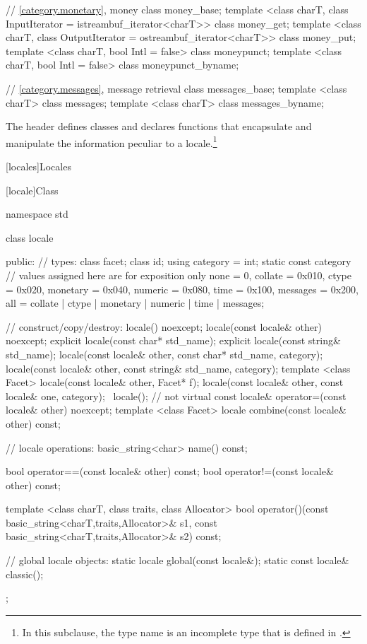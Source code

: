 \begin{codeblock}
{  // \ref{category.monetary}, money
  class money_base;
  template <class charT, class InputIterator = istreambuf_iterator<charT>>  class money_get;
  template <class charT, class OutputIterator = ostreambuf_iterator<charT>> class money_put;
  template <class charT, bool Intl = false> class moneypunct;
  template <class charT, bool Intl = false> class moneypunct_byname;

  // \ref{category.messages}, message retrieval
  class messages_base;
  template <class charT> class messages;
  template <class charT> class messages_byname;
}
\end{codeblock}

\pnum
The header
defines classes and declares functions that encapsulate and manipulate
the information peculiar to a locale.\footnote{In this subclause, the type name
is an incomplete type that is defined in
%
.}

[locales]{Locales}

[locale]{Class }

%
\begin{codeblock}
namespace std {
  class locale {
  public:
    // types:
    class facet;
    class id;
    using category = int;
    static const category   // values assigned here are for exposition only
      none     = 0,
      collate  = 0x010, ctype    = 0x020,
      monetary = 0x040, numeric  = 0x080,
      time     = 0x100, messages = 0x200,
      all = collate | ctype | monetary | numeric | time  | messages;

    // construct/copy/destroy:
    locale() noexcept;
    locale(const locale& other) noexcept;
    explicit locale(const char* std_name);
    explicit locale(const string& std_name);
    locale(const locale& other, const char* std_name, category);
    locale(const locale& other, const string& std_name, category);
    template <class Facet> locale(const locale& other, Facet* f);
    locale(const locale& other, const locale& one, category);
    ~locale();                  // not virtual
    const locale& operator=(const locale& other) noexcept;
    template <class Facet> locale combine(const locale& other) const;

    // locale operations:
    basic_string<char>                  name() const;

    bool operator==(const locale& other) const;
    bool operator!=(const locale& other) const;

    template <class charT, class traits, class Allocator>
      bool operator()(const basic_string<charT,traits,Allocator>& s1,
                      const basic_string<charT,traits,Allocator>& s2) const;

    // global locale objects:
    static       locale  global(const locale&);
    static const locale& classic();
  };
}
\end{codeblock}

